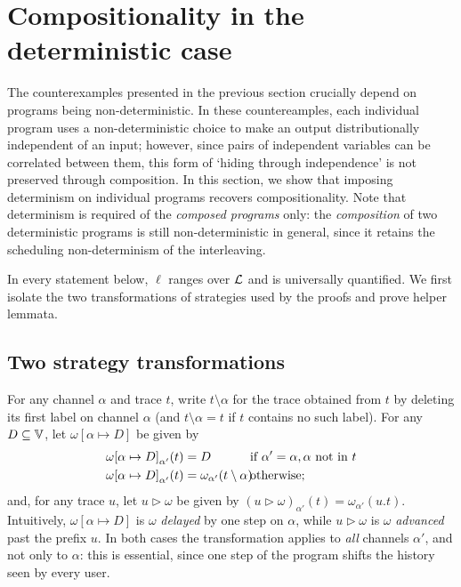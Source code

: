 \documentclass[preprint,5p,twocolumn]{elsarticle}
\begin{document}
\section{Compositionality in the deterministic case}

\label{sec:deterministic}

The counterexamples presented in the previous section crucially depend on programs being non-deterministic.
In these countereamples, each individual program uses a non-deterministic choice to make an output
distributionally independent of an input; however, since pairs of independent variables can be correlated between them,
this form of `hiding through independence' is not preserved through composition.
In this section, we show that imposing determinism on individual programs recovers compositionality.
Note that determinism is required of the \emph{composed programs} only:
the \emph{composition} of two deterministic programs is still non-deterministic in general,
since it retains the scheduling non-determinism of the interleaving.

In every statement below, $\ell$ ranges over $\mathcal{L}$ and is universally quantified. We first
isolate the two transformations of strategies used by the proofs and prove helper lemmata.

\subsection{Two strategy transformations}

For any channel $\alpha$ and trace $t$, write $t \setminus \alpha$ for the trace obtained from $t$
by deleting its first label on channel $\alpha$ (and $t \setminus \alpha = t$ if $t$ contains no
such label). For any $D \subseteq \mathbb{V}$, let $\omega[\alpha \mapsto D]$ be given by
\begin{align*}
  {\omega[\alpha \mapsto D]}_{\alpha'}(t) &= D && \hspace{-1.2em}\text{if } \alpha' = \alpha, \alpha \text{ not in } t\\
  {\omega[\alpha \mapsto D]}_{\alpha'}(t) &= {\omega}_{\alpha'}(t \setminus \alpha) && \hspace{-1.2em}\text{otherwise;}
\end{align*}
and, for any trace $u$, let $u \triangleright \omega$ be given by
${(u \triangleright \omega)}_{\alpha'}(t) = \omega_{\alpha'}(u.t)$.
Intuitively, $\omega[\alpha \mapsto D]$ is $\omega$ \emph{delayed} by one step on $\alpha$, while
$u \triangleright \omega$ is $\omega$ \emph{advanced} past the prefix $u$. In both cases the
transformation applies to \emph{all} channels $\alpha'$, and not only to $\alpha$: this is
essential, since one step of the program shifts the history seen by every user.
\end{document}
